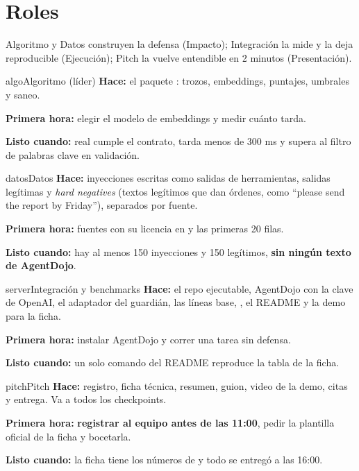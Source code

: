 
\section{Roles}
Algoritmo y Datos construyen la defensa (Impacto); Integración la mide y la deja reproducible (Ejecución); Pitch la vuelve entendible en 2 minutos (Presentación).

\begin{card}{algo}{Algoritmo (líder)}
\textbf{Hace:} el paquete : trozos, embeddings, puntajes, umbrales y saneo.\par
\textbf{Primera hora:} elegir el modelo de embeddings y medir cuánto tarda.\par
\textbf{Listo cuando:}  real cumple el contrato, tarda menos de 300 ms y supera al filtro de palabras clave en validación.
\end{card}

\begin{card}{datos}{Datos}
\textbf{Hace:} inyecciones escritas como salidas de herramientas, salidas legítimas y \emph{hard negatives} (textos legítimos que dan órdenes, como “please send the report by Friday”), separados por fuente.\par
\textbf{Primera hora:} fuentes con su licencia en  y las primeras 20 filas.\par
\textbf{Listo cuando:} hay al menos 150 inyecciones y 150 legítimos, \textbf{sin ningún texto de AgentDojo}.
\end{card}

\begin{card}{server}{Integración y benchmarks}
\textbf{Hace:} el repo ejecutable, AgentDojo con la clave de OpenAI, el adaptador del guardián, las líneas base, , el README y la demo para la ficha.\par
\textbf{Primera hora:} instalar AgentDojo y correr una tarea sin defensa.\par
\textbf{Listo cuando:} un solo comando del README reproduce la tabla de la ficha.
\end{card}

\begin{card}{pitch}{Pitch}
\textbf{Hace:} registro, ficha técnica, resumen, guion, video de la demo, citas y entrega. Va a todos los checkpoints.\par
\textbf{Primera hora:} \textbf{registrar al equipo antes de las 11:00}, pedir la plantilla oficial de la ficha y bocetarla.\par
\textbf{Listo cuando:} la ficha tiene los números de  y todo se entregó a las 16:00.
\end{card}

